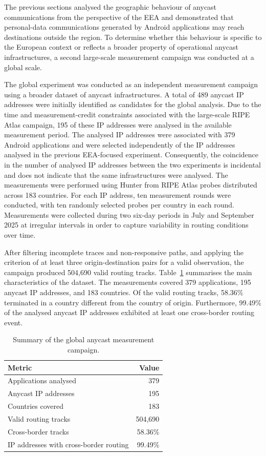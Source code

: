 The previous sections analysed the geographic behaviour of anycast communications from the perspective of the EEA and demonstrated that personal-data communications generated by Android applications may reach destinations outside the region. To determine whether this behaviour is specific to the European context or reflects a broader property of operational anycast infrastructures, a second large-scale measurement campaign was conducted at a global scale.

The global experiment was conducted as an independent measurement campaign using a broader dataset of anycast infrastructures. A total of 489 anycast IP addresses were initially identified as candidates for the global analysis. Due to the time and measurement-credit constraints associated with the large-scale RIPE Atlas campaign, 195 of these IP addresses were analysed in the available measurement period. The analysed IP addresses were associated with 379 Android applications and were selected independently of the IP addresses analysed in the previous EEA-focused experiment. Consequently, the coincidence in the number of analysed IP addresses between the two experiments is incidental and does not indicate that the same infrastructures were analysed. The measurements were performed using Hunter from RIPE Atlas probes distributed across 183 countries. For each IP address, ten measurement rounds were conducted, with ten randomly selected probes per country in each round. Measurements were collected during two six-day periods in July and September 2025 at irregular intervals in order to capture variability in routing conditions over time.

After filtering incomplete traces and non-responsive paths, and applying the criterion of at least three origin-destination pairs for a valid observation, the campaign produced 504,690 valid routing tracks. Table~\ref{tab:global_hunter_summary} summarises the main characteristics of the dataset. The measurements covered 379 applications, 195 anycast IP addresses, and 183 countries. Of the valid routing tracks, 58.36\% terminated in a country different from the country of origin. Furthermore, 99.49\% of the analysed anycast IP addresses exhibited at least one cross-border routing event.

\begin{table}[ht]
    \centering
    \small
    \caption{Summary of the global anycast measurement campaign.}
    \label{tab:global_hunter_summary}
    \begin{tabular}{lr}
        \toprule
        \textbf{Metric} & \textbf{Value} \\
        \midrule
        Applications analysed & 379 \\
        Anycast IP addresses & 195 \\
        Countries covered & 183 \\
        Valid routing tracks & 504,690 \\
        Cross-border tracks & 58.36\% \\
        IP addresses with cross-border routing & 99.49\% \\
        \bottomrule
    \end{tabular}
\end{table}

